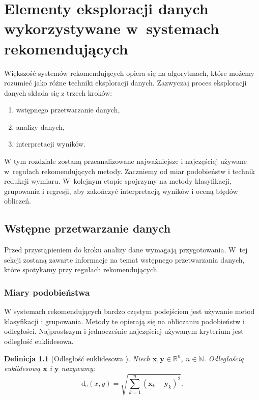 \documentclass[12pt,a4paper]{report}
\newtheorem{df}{Definicja}[chapter]
\newcommand{\setR}{\mathbb{R}}
\newcommand{\setN}{\mathbb{N}}
\newcommand{\distanceee}[2]{\operatorname{d_e}\left({#1}, {#2} \right)}
\begin{document}
\chapter{Elementy eksploracji danych wykorzystywane w~systemach rekomendujących}
Większość systemów rekomendujących opiera się na algorytmach, które możemy rozumieć jako różne techniki eksploracji danych. 
Zazwyczaj proces eksploracji danych składa się z trzech kroków:
\begin{enumerate}
\item wstępnego przetwarzanie danych,
\item analizy danych,
\item interpretacji wyników.
\end{enumerate}
W tym rozdziale zostaną przeanalizowane najważniejsze i najczęściej używane w~regułach rekomendujących metody. Zaczniemy od miar podobieństw i technik redukcji wymiaru. W~kolejnym etapie spojrzymy na metody klasyfikacji, grupowania i regresji, aby zakończyć interpretacją wyników i oceną błędów obliczeń.

\section{Wstępne przetwarzanie danych}
Przed przystąpieniem do kroku analizy dane wymagają przygotowania. W~tej sekcji zostaną zawarte informacje na temat wstępnego przetwarzania danych, które spotykamy przy regułach rekomendujących.

\subsection{Miary podobieństwa}
W systemach rekomendujących bardzo częstym podejściem jest używanie metod klasyfikacji i grupowania. Metody te opierają się na obliczaniu podobieństw i odległości.
Najprostszym i jednocześnie najczęściej używanym kryterium jest odległość euklidesowa.

\begin{df}[Odległość euklidesowa \citep{rsh}]%

Niech $\mathbf{x},\mathbf{y} \in \setR^n $, $n \in\setN$. Odległością euklidesową $\mathbf{x}$ i $\mathbf{y}$ nazywamy:
$$
\distanceee{x}{y} = \sqrt{\sum_{k=1}^n(\mathbf{x}_k-\mathbf{y}_k)^2}.
$$
\end{df}
\end{document}
